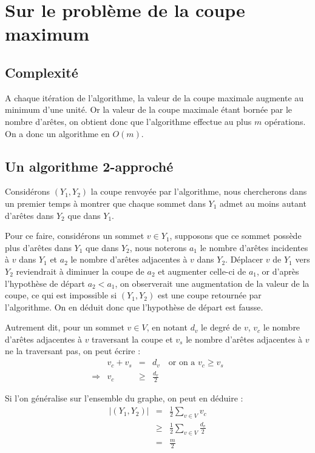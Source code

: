 \section{Sur le problème de la coupe maximum}

\subsection{Complexité}

A chaque itération de l'algorithme, la valeur de la coupe maximale augmente au minimum d'une unité.
Or la valeur de la coupe maximale étant bornée par le nombre d'arêtes, on obtient donc que
l'algorithme effectue au plus $m$ opérations. On a donc un algorithme en $O(m)$.

\subsection{Un algorithme 2-approché}

Considérons $(Y_1, Y_2)$ la coupe renvoyée par l'algorithme, nous chercherons dans un premier temps
à montrer que chaque sommet dans $Y_1$ admet au moins autant d'arêtes dans $Y_2$ que dans $Y_1$.

Pour ce faire, considérons un sommet $v \in Y_1$, supposons que ce sommet possède plus d'arêtes dans
$Y_1$ que dans $Y_2$, nous noterons $a_1$ le nombre d'arêtes incidentes à $v$ dans $Y_1$ et $a_2$ le
nombre d'arêtes adjacentes à $v$ dans $Y_2$. Déplacer $v$ de $Y_1$ vers $Y_2$ reviendrait à diminuer
la coupe de $a_2$ et augmenter celle-ci de $a_1$, or d'après l'hypothèse de départ $a_2 < a_1$, on
observerait une augmentation de la valeur de la coupe, ce qui est impossible si $(Y_1, Y_2)$ est une
coupe retournée par l'algorithme. On en déduit donc que l'hypothèse de départ est fausse.

Autrement dit, pour un sommet $v \in V$, en notant $d_v$ le degré de $v$, $v_c$ le nombre d'arêtes
adjacentes à $v$ traversant la coupe et $v_s$ le nombre d'arêtes adjacentes à $v$ ne la traversant
pas, on peut écrire : $$
\begin{array}{lrcl}
	&v_c + v_s &=& d_v \quad \mbox{or on a } v_c \geq v_s \\
	\Rightarrow & v_c & \geq & \frac{d_v}{2}
\end{array} $$

Si l'on généralise sur l'ensemble du graphe, on peut en déduire : $$
\begin{array}{rcl}
	|(Y_1,Y_2)| & = & \frac{1}{2} \sum_{v \in V} v_c\\
							& \geq & \frac{1}{2} \sum_{v \in V} \frac{d_v}{2} \\
					 	& = & \frac{m}{2}
\end{array}
$$

